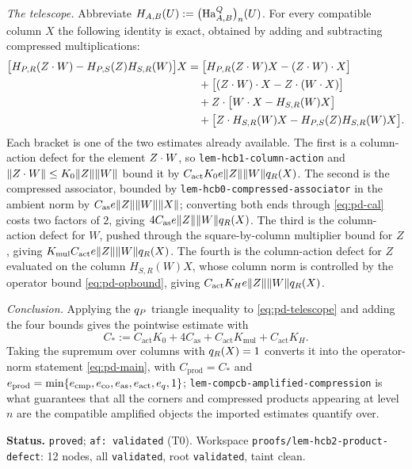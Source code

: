 \emph{The telescope.} Abbreviate $H_{A,B}(U):=\bigl(\mathrm{Ha}^{Q}_{A,B}\bigr)_{n}(U)$. For every compatible
column $X$ the following identity is exact, obtained by adding and subtracting compressed
multiplications:
\begin{align}\label{eq:pd-telescope}
  \bigl[H_{P,R}(Z\mathbin{\cdot} W)-H_{P,S}(Z)H_{S,R}(W)\bigr]X
  &=\bigl[H_{P,R}(Z\mathbin{\cdot} W)X-(Z\mathbin{\cdot} W)\mathbin{\cdot} X\bigr] \notag\\
  &\quad+\bigl[(Z\mathbin{\cdot} W)\mathbin{\cdot} X-Z\mathbin{\cdot}(W\mathbin{\cdot} X)\bigr] \notag\\
  &\quad+Z\mathbin{\cdot}\bigl[W\mathbin{\cdot} X-H_{S,R}(W)X\bigr] \notag\\
  &\quad+\bigl[Z\mathbin{\cdot} H_{S,R}(W)X-H_{P,S}(Z)H_{S,R}(W)X\bigr].
\end{align}
Each bracket is one of the two estimates already available. The first is a column-action
defect for the element $Z\mathbin{\cdot} W$, so
\texttt{lem-hcb1-column-action} and $\lVert Z\mathbin{\cdot} W\rVert\le K_0\lVert Z\rVert\lVert W\rVert$ bound it by
$C_{\mathrm{act}}K_0e\lVert Z\rVert\lVert W\rVert q_{R}(X)$. The second is the compressed
associator, bounded by \texttt{lem-hcb0-compressed-associator} in the ambient norm by
$C_{\mathrm{as}}e\lVert Z\rVert\lVert W\rVert\lVert X\rVert$; converting both ends through
\eqref{eq:pd-cal} costs two factors of $2$, giving
$4C_{\mathrm{as}}e\lVert Z\rVert\lVert W\rVert q_{R}(X)$. The third is the column-action defect
for $W$, pushed through the square-by-column multiplier bound for $Z$, giving
$K_{\mathrm{mul}}C_{\mathrm{act}}e\lVert Z\rVert\lVert W\rVert q_{R}(X)$. The fourth is the
column-action defect for $Z$ evaluated on the column $H_{S,R}(W)X$, whose column norm is
controlled by the operator bound \eqref{eq:pd-opbound}, giving
$C_{\mathrm{act}}K_He\lVert Z\rVert\lVert W\rVert q_{R}(X)$.

\emph{Conclusion.} Applying the $q_{P}$ triangle inequality to
\eqref{eq:pd-telescope} and adding the four bounds gives the pointwise estimate with
\[
  C_*:=C_{\mathrm{act}}K_0+4C_{\mathrm{as}}+C_{\mathrm{act}}K_{\mathrm{mul}}+C_{\mathrm{act}}K_H .
\]
Taking the supremum over columns with $q_{R}(X)=1$ converts it into the operator-norm
statement \eqref{eq:pd-main}, with $C_{\mathrm{prod}}=C_*$ and
$e_{\mathrm{prod}}=\min\{e_{\mathrm{cmp}},e_{\mathrm{co}},e_{\mathrm{as}},e_{\mathrm{act}},e_q,1\}$;
\texttt{lem-compcb-amplified-compression} is what guarantees that all the corners and
compressed products appearing at level $n$ are the compatible amplified objects the
imported estimates quantify over.

\medskip
\noindent\textbf{Status.} \texttt{proved}; \texttt{af: validated} (T0). Workspace
\texttt{proofs/lem-hcb2-product-defect}: 12 nodes, all \texttt{validated}, root
\texttt{validated}, taint clean.

